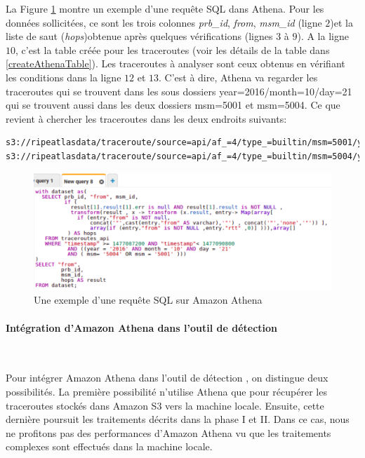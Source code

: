 La Figure \ref{fig:sqlrequestathena} montre  un exemple d'une  requête SQL dans Athena. 
Pour les données sollicitées, ce sont les trois colonnes \textit{prb\_id}, \textit{from}, \textit{msm\_id} (ligne $2$)et la liste de saut (\textit{hops})obtenue après quelques vérifications (lignes $3$ à $9$). A la ligne $10$, c'est la table créée pour les traceroutes (voir les détails de la table dans \ref{createAthenaTable}). Les traceroutes à analyser sont ceux obtenus en vérifiant les conditions dans la ligne  $12$ et $13$. C'est à dire, Athena va regarder les traceroutes qui se trouvent dans les sous dossiers year=2016/month=10/day=21 qui se trouvent aussi dans les deux dossiers msm=5001 et msm=5004. Ce que revient à chercher les traceroutes dans les deux endroits suivants:

\begin{lstlisting}[basicstyle= \footnotesize]
s3://ripeatlasdata/traceroute/source=api/af_=4/type_=builtin/msm=5001/year=2016/month=10/day=21
s3://ripeatlasdata/traceroute/source=api/af_=4/type_=builtin/msm=5004/year=2016/month=10/day=21
\end{lstlisting}

\begin{figure}[h]
	\centering
	\includegraphics[width=1\linewidth]{illustrations/sqlRequestAthena1.png}

	\caption{Une exemple d'une requête SQL sur Amazon Athena}
	\label{fig:sqlrequestathena}
\end{figure}

\paragraph{Intégration d'Amazon Athena dans l'outil de détection}~ \label{integration-aws-possibilite-une}


Pour intégrer Amazon Athena dans l'outil de détection \cite{InternetHealthReport}, on distingue deux possibilités. La première possibilité n'utilise Athena que pour récupérer  les traceroutes stockés dans Amazon S3 vers  la machine locale. Ensuite, cette dernière poursuit les traitements  décrits dans la phase I et II. Dans ce cas, nous ne profitons pas  des performances d'Amazon Athena vu que les traitements complexes sont effectués dans la machine locale.

